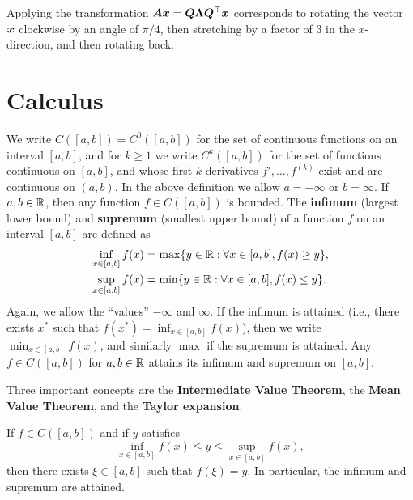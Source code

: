\begin{example}
\begin{figure}[ht!]
\end{figure}

Applying the transformation $\bm{A}\bm{x} = \bm{Q}\bm{\Lambda}\bm{Q}^{\top}\bm{x}$ corresponds to rotating the vector $\bm{x}$ clockwise by an angle of $\pi/4$, then stretching by a factor of $3$ in the $x$-direction, and then rotating back.
\end{example}

\section{Calculus}
\setcounter{figure}{0}
We write $C([a,b])=C^0([a,b])$ for the set of continuous functions on an interval $[a,b]$, and for $k\geq 1$ we write $C^k([a,b])$ for the set of functions continuous on $[a,b]$, and whose first $k$ derivatives $f',\dots,f^{(k)}$ exist and are continuous on $(a,b)$. In the above definition we allow $a=-\infty$ or $b=\infty$. If $a,b\in \mathbb{R}$, then any function $f\in C([a,b])$ is bounded. The \strictpagecheck{}\textbf{infimum} (largest lower bound) and \textbf{supremum} (smallest upper bound) of a function $f$ on an interval $[a,b]$ are defined as
\begin{align*}
 \inf_{x\in [a,b]} f(x) &= \max\{y\in \mathbb{R} \mathrel{\mathop{:}} \forall x\in [a,b], f(x)\geq y\},\\
  \sup_{x\in [a,b]} f(x) &= \min\{y\in\mathbb{R} \mathrel{\mathop{:}} \forall x\in [a,b], f(x)\leq y\}.
\end{align*}
Again, we allow the ``values'' $-\infty$ and $\infty$. If the infimum is attained (i.e., there exists $x^*$ such that $f(x^*) = \inf_{x\in [a,b]} f(x)$), then we write $\min_{x\in [a,b]}f(x)$, and similarly $\max$ if the supremum is attained. Any $f\in C([a,b])$ for $a,b\in \mathbb{R}$ attains its infimum and supremum on $[a,b]$.

Three important concepts are the \textbf{Intermediate Value Theorem}, the \textbf{Mean Value Theorem}, and the \textbf{Taylor expansion}. 

\begin{theorem*}
\strictpagecheck
{}If $f\in C([a,b])$ and if $y$ satisfies
\begin{equation*}
\inf_{x\in [a,b]} f(x)\leq y\leq \sup_{x\in [a,b]} f(x),
\end{equation*}
then there exists $\xi \in [a,b]$ such that $f(\xi)=y$. In particular, the infimum and supremum are attained.
\end{theorem*}

